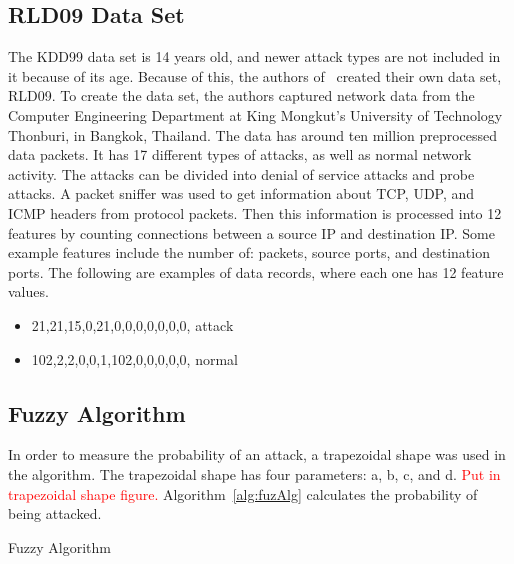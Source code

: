 \documentclass{sig-alternate}
\newcommand{\mycomment}[1]{\textcolor{red}{#1}}
\begin{document}
\subsection{RLD09 Data Set}
The KDD99 data set is 14 years old, and newer attack types are not included in it because of its age. Because of this, the authors of~\cite{6496342, 6559603} created their own data set, RLD09. To create the data set, the authors captured network data from the Computer Engineering Department at King Mongkut's University of Technology Thonburi, in Bangkok, Thailand. The data has around ten million preprocessed data packets. It has 17 different types of attacks, as well as normal network activity. The attacks can be divided into denial of service attacks and probe attacks. A packet sniffer was used to get information about TCP, UDP, and ICMP headers from protocol packets. Then this information is processed into 12 features by counting connections between a source IP and destination IP. Some example features include the number of: packets, source ports, and destination ports. The following are examples of data records, where each one has 12 feature values.

\begin{itemize}
\item 21,21,15,0,21,0,0,0,0,0,0,0, attack
\item 102,2,2,0,0,1,102,0,0,0,0,0, normal
\end{itemize}




\subsection{Fuzzy Algorithm}
In order to measure the probability of an attack, a trapezoidal shape was used in the algorithm. The trapezoidal shape has four parameters: a, b, c, and d. 
\mycomment{Put in trapezoidal shape figure.} Algorithm~\ref{alg:fuzAlg} calculates the probability of being attacked.

\begin{algorithm}
\caption{Fuzzy Algorithm}
\label{alg:fuzAlg}
\begin{algorithmic}
\ELSE {}
\ENDIF
\end{algorithmic}
\end{algorithm}
\end{document}
